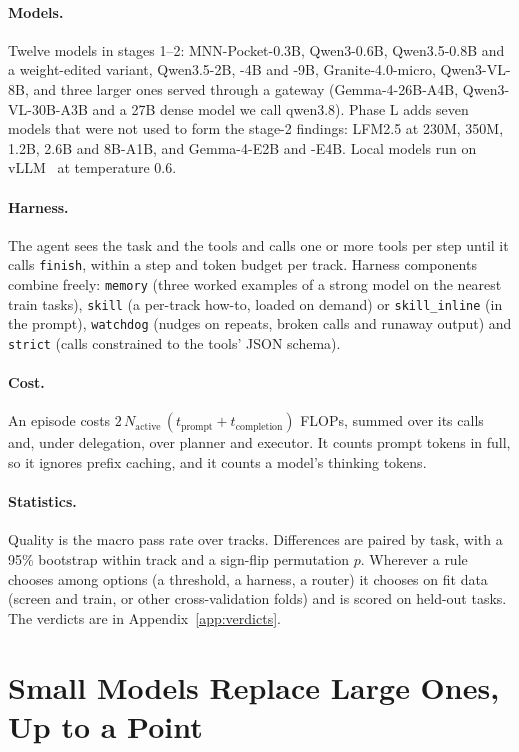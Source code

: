\paragraph{Models.} Twelve models in stages 1--2: MNN-Pocket-0.3B, Qwen3-0.6B, Qwen3.5-0.8B and a weight-edited
variant, Qwen3.5-2B, -4B and -9B, Granite-4.0-micro, Qwen3-VL-8B, and three larger ones served through a gateway
(Gemma-4-26B-A4B, Qwen3-VL-30B-A3B and a 27B dense model we call qwen3.8). Phase L adds seven models that were not
used to form the stage-2 findings: LFM2.5 at 230M, 350M, 1.2B, 2.6B and 8B-A1B, and Gemma-4-E2B and -E4B. Local
models run on vLLM~\cite{kwon2023vllm} at temperature 0.6.

\paragraph{Harness.} The agent sees the task and the tools and calls one or more tools per step until it calls
\texttt{finish}, within a step and token budget per track. Harness components combine freely: \texttt{memory} (three
worked examples of a strong model on the nearest train tasks), \texttt{skill} (a per-track how-to, loaded on demand)
or \texttt{skill\_inline} (in the prompt), \texttt{watchdog} (nudges on repeats, broken calls and runaway output) and
\texttt{strict} (calls constrained to the tools' JSON schema).

\paragraph{Cost.} An episode costs $2\,N_\text{active}\,(t_\text{prompt}+t_\text{completion})$ FLOPs, summed over its
calls and, under delegation, over planner and executor. It counts prompt tokens in full, so it ignores prefix
caching, and it counts a model's thinking tokens.

\paragraph{Statistics.} Quality is the macro pass rate over tracks. Differences are paired by task, with a 95\%
bootstrap within track and a sign-flip permutation $p$. Wherever a rule chooses among options (a threshold, a
harness, a router) it chooses on fit data (screen and train, or other cross-validation folds) and is scored on held-out
tasks. The \nHypotheses{} verdicts are in Appendix~\ref{app:verdicts}.

\section{Small Models Replace Large Ones, Up to a Point}\label{sec:replace}

